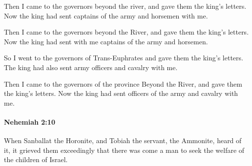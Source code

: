 			Then I came to the governors beyond the river, and gave them the king’s letters. Now the king had sent captains of the army and horsemen with me.

			\begin{versebox}
					\item[BHS] 
					\item[LXX] 
					\item[ASV] Then I came to the governors beyond the River, and gave them the king's letters. Now the king had sent with me captains of the army and horsemen.
					\item[NIV] So I went to the governors of Trans-Euphrates and gave them the king’s letters. The king had also sent army officers and cavalry with me.
					\item[NRSV] Then I came to the governors of the province Beyond the River, and gave them the king’s letters. Now the king had sent officers of the army and cavalry with me.
			\end{versebox}

		\paragraph{Nehemiah 2:10} %
			\label{NEHEMIAH-2-10}

			When Sanballat the Horonite, and Tobiah the servant, the Ammonite, heard of it, it grieved them exceedingly that there was come a man to seek the welfare of the children of Israel.

